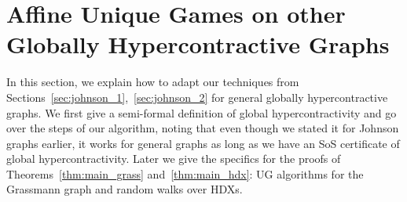 \section{Affine Unique Games on other Globally Hypercontractive Graphs}\label{sec:other_graphs}
In this section, we explain how to adapt our techniques from Sections~\ref{sec:johnson_1},~\ref{sec:johnson_2} for 
general globally hypercontractive graphs. We first give a semi-formal definition of global hypercontractivity and go over the steps of our algorithm, noting that even though we stated it for Johnson graphs earlier, it works for general graphs as long as we have an SoS certificate of global hypercontractivity. Later we give the specifics for the proofs of Theorems~\ref{thm:main_grass} and~\ref{thm:main_hdx}: UG algorithms for the Grassmann graph and random walks over HDXs.

